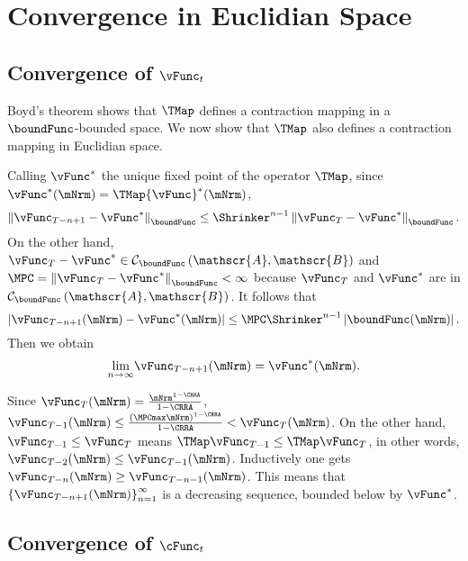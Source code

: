 \documentclass[\econtexRoot/BufferStockTheory]{subfiles}
\begin{document}
\section{Convergence in Euclidian Space}
\subsection{Convergence of
  \texorpdfstring{$\vFunc_{t}$}{vFunc-{t}}}\label{sec:vEuclidian}

Boyd's theorem shows that $\TMap$ defines a contraction mapping
in a $\boundFunc$-bounded space. We now show that $\TMap$ also
defines a contraction mapping in Euclidian space.

Calling $\vFunc^{\ast}$ the unique fixed point of the operator $\TMap$, since $\vFunc^{\ast }(\mNrm)=\TMap {\vFunc}^{\ast }(\mNrm)$,
\begin{equation}
\left\Vert \vFunc_{T-n+1}-\vFunc^{\ast }\right\Vert _{\boundFunc }\leq \Shrinker
^{n-1}\left\Vert \vFunc_{T}-\vFunc^{\ast }\right\Vert _{\boundFunc }.
\end{equation}%
On the other hand, $\vFunc_{T}-\vFunc^{\ast }\in \mathcal{C}_{\boundFunc }\left( \mathscr{A},
\mathscr{B}\right) $ and $\MPC =\left\Vert \vFunc_{T}-\vFunc^{\ast }\right\Vert_{\boundFunc }<\infty $ because $\vFunc_{T}$ and $\vFunc^{\ast }$ are in $\mathcal{C}_{\boundFunc
}\left( \mathscr{A},\mathscr{B}\right) $. It follows that%
\begin{equation}
\left\vert \vFunc_{T-n+1}(\mNrm)-\vFunc^{\ast }(\mNrm)\right\vert \leq \MPC \Shrinker^{n-1}\left\vert \boundFunc(\mNrm)\right\vert.
\end{equation}%
Then we obtain
\begin{equation}
\underset{n\rightarrow \infty }{\lim }\vFunc_{T-n+1}(\mNrm)=\vFunc^{\ast }(\mNrm).
\end{equation}

Since $\vFunc_{T}(\mNrm)=\frac{\mNrm^{1-\CRRA }}{1-\CRRA }$, $\vFunc_{T-1}(\mNrm)\leq \frac{{\left(\MPCmax \mNrm\right)}^{1-\CRRA}}{1-\CRRA}<\vFunc_{T}(\mNrm)$. On the other hand, $\vFunc_{T-1}\leq \vFunc_{T}$
means $\TMap\vFunc_{T-1}\leq \TMap\vFunc_{T}$, in other words, $\vFunc_{T-2}(\mNrm)\leq \vFunc_{T-1}(\mNrm)$.
Inductively one gets $\vFunc_{T-n}(\mNrm)\geq \vFunc_{T-n-1}(\mNrm)$. This means that $\left\{
\vFunc_{T-n+1}(\mNrm)\right\} _{n=1}^{\infty }$ is a decreasing sequence,
bounded below by $\vFunc^{\ast}$.


\subsection{Convergence of \texorpdfstring{$\cFunc_{t}$}{cFunc-{t}}}\label{subsec:cConverges}%
\end{document}
